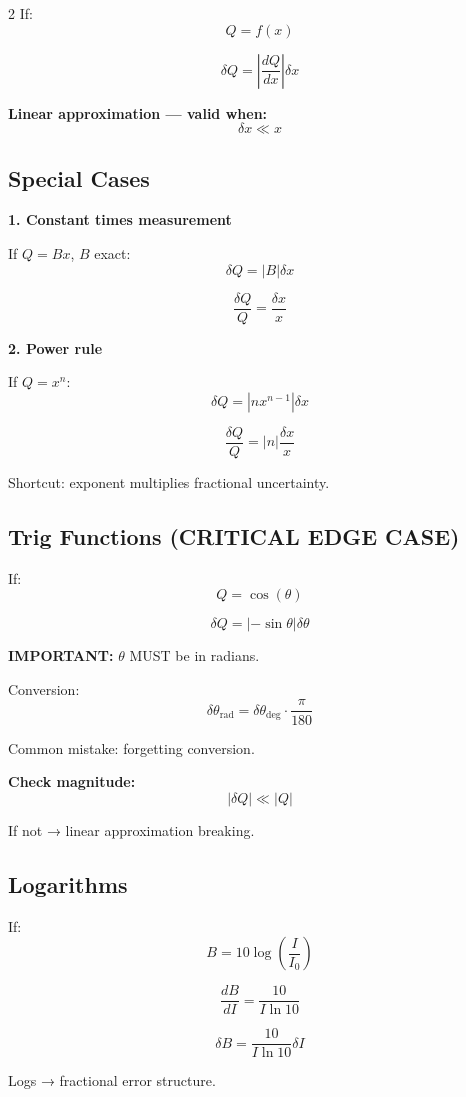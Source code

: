 \documentclass[10pt,landscape]{article}
\begin{document}
\begin{multicols}{2}
If:
\[
Q = f(x)
\]

\[
\boxed{\delta Q = \left| \frac{dQ}{dx} \right| \delta x}
\]

\textbf{Linear approximation — valid when:}
\[
\delta x \ll x
\]

\subsection*{Special Cases}

\textbf{1. Constant times measurement}

If $Q = Bx$, $B$ exact:
\[
\delta Q = |B| \delta x
\]

\[
\frac{\delta Q}{Q} = \frac{\delta x}{x}
\]

\textbf{2. Power rule}

If $Q = x^n$:
\[
\delta Q = |n x^{n-1}| \delta x
\]

\[
\boxed{\frac{\delta Q}{Q} = |n|\frac{\delta x}{x}}
\]

Shortcut: exponent multiplies fractional uncertainty.

\subsection*{Trig Functions (CRITICAL EDGE CASE)}

If:
\[
Q = \cos(\theta)
\]

\[
\delta Q = |-\sin\theta| \delta\theta
\]

\textbf{IMPORTANT:} $\theta$ MUST be in radians.

Conversion:
\[
\delta\theta_{\text{rad}} = \delta\theta_{\text{deg}} \cdot \frac{\pi}{180}
\]

Common mistake: forgetting conversion.

\textbf{Check magnitude:}
\[
|\delta Q| \ll |Q|
\]

If not → linear approximation breaking.

\subsection*{Logarithms}

If:
\[
B = 10\log\left(\frac{I}{I_0}\right)
\]

\[
\frac{dB}{dI} = \frac{10}{I\ln 10}
\]

\[
\boxed{\delta B = \frac{10}{I\ln 10}\delta I}
\]

Logs → fractional error structure.


\end{multicols}
\end{document}

